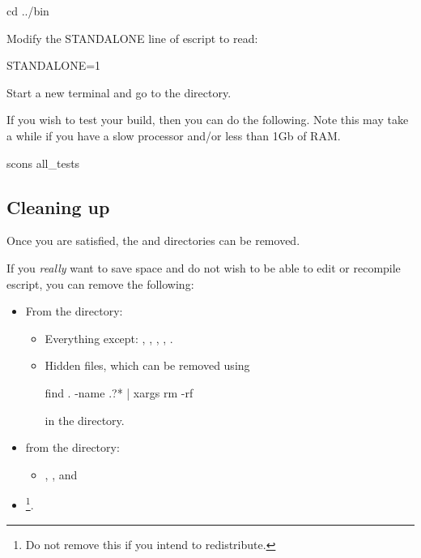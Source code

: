 \begin{shellCode}
cd ../bin
\end{shellCode}

Modify the STANDALONE line of \figurename{escript} to read:
 
STANDALONE=1

Start a new terminal and go to the  directory.


If you wish to test your build, then you can do the following. 
Note this may take a while if you have a slow processor and/or less than 1Gb of RAM.
\begin{shellCode}
scons all_tests
\end{shellCode}

\subsection{Cleaning up}
Once you are satisfied, the  and  directories can be removed.

If you \emph{really} want to save space and do not wish to be able to edit or recompile escript, you can remove the following:
\begin{itemize}
 \item From the  directory:\begin{itemize}
\item Everything except: , , , ,
.
\item Hidden files, which can be removed using
\begin{shellCode}
find . -name .?* | xargs rm -rf
\end{shellCode}
in the  directory.
\end{itemize}
\item from the  directory:
\begin{itemize}
\item  {}, ,  and 
\end{itemize}
\item {}\footnote{Do not remove this if you intend to redistribute.}.
\end{itemize}


